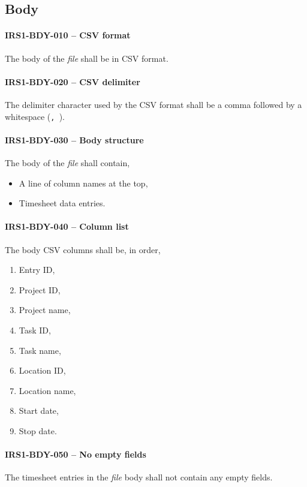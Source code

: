 \subsection{Body}
\paragraph{IRS1-BDY-010 -- CSV format}
The body of the \emph{file} shall be in \gls{CSV} format.

\paragraph{IRS1-BDY-020 -- CSV delimiter}
The delimiter character used by the \gls{CSV} format shall be a comma followed
by a whitespace (\lstinline{, }).

\paragraph{IRS1-BDY-030 -- Body structure}
The body of the \emph{file} shall contain,
\begin{itemize}
\item A line of column names at the top,
\item Timesheet data entries.
\end{itemize}

\paragraph{IRS1-BDY-040 -- Column list}
The body \gls{CSV} columns shall be, in order,
\begin{enumerate}
\item Entry ID,
\item Project ID,
\item Project name,
\item Task ID,
\item Task name,
\item Location ID,
\item Location name,
\item Start date,
\item Stop date.
\end{enumerate}

\paragraph{IRS1-BDY-050 -- No empty fields}
The timesheet entries in the \emph{file} body shall not contain any empty
fields.

